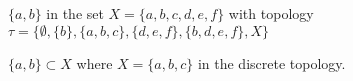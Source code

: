\begin{pa}
\begin{comment}

\solution Neither $a$ nor $b$ is a limit point of $\{c,d\}$ since the open neighborhood $\{a,b\}$ contains no point in $\{c,d\}$ different than $a$ or $b$. The only open set that contains $c$ or $d$ is $X$, so that is the only neighborhood of $c$ or $d$. Since $X$ contains a point in $\{c,d]{$ that is different than $c$ (or $d$), both $c$ and $d$ are limit points of $\{c,d\}$. 




\end{comment}


	\item $\{a,b\}$ in the set $X= \{a,b,c,d,e,f\}$ with topology $\tau= \{\emptyset,\{b\}, \{a,b,c\},\{d,e,f\},\{b,d,e,f\}, X\}$ 



\begin{comment}

\solution None of the points $b$, $d$, $e$, or $f$ is a limit point of $\{a,b\}$ since the open neighborhood $\{b,d,e,f\}$ contains no point in $\{a,b\}$ different than $b$, $d$, $e$, or $f$. Any neighborhood of $a$ or $c$ must contain one of the open sets $\{a,b,c\}$ or $X$. So every neighborhood of $a$ or $c$ contains a point of $\{a,b\}$ different than $a$ or $c$. Therefore, the limit points of $\{a,b\}$ are $a$ and $c$ and $\{a,b\}' = \{a,c\}$. 




\end{comment}


	\item $\{a,b\} \subset X$ where $X = \{a,b,c\}$ in the discrete topology. 



\begin{comment}

\solution For any $x \in \{a,b\}$, the open neighborhood $\{x\}$ of $x$ does not contain any points in $\{a,b\}$ different than $x$. So the set $\{a,b\}$ has no limit points. 



\end{comment}
 

\ea

\ee



\end{pa}

\label{sec_closed_sets_top_spaces}

